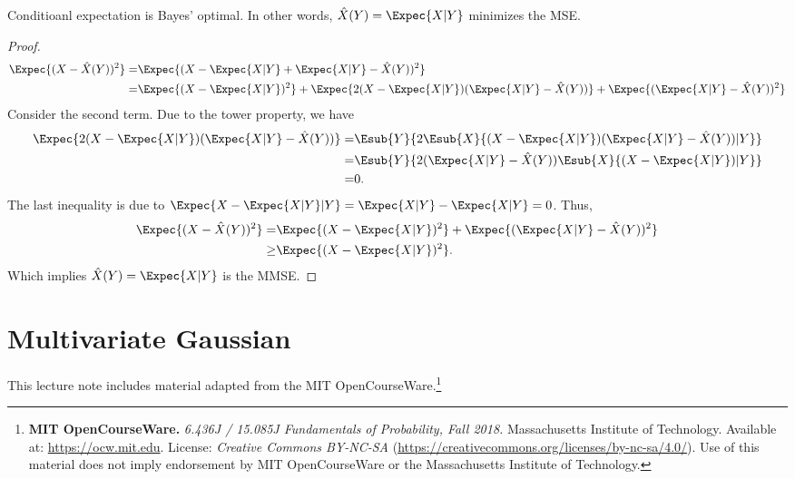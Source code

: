 \documentclass{article}
\begin{document}
\begin{theorem}
    Conditioanl expectation is Bayes' optimal.
    In other words, $\hat{X}(Y) = \Expec{X|Y}$ minimizes the MSE.
\end{theorem}
\begin{proof}
\begin{align}
    \Expec{(X-\hat{X}(Y))^2}=& \Expec{(X-\Expec{X|Y} + \Expec{X|Y} -\hat{X}(Y))^2}\\
    =& \Expec{(X-\Expec{X|Y})^2} + \Expec{2(X-\Expec{X|Y})(\Expec{X|Y}-\hat{X}(Y))}+\Expec{(\Expec{X|Y} -\hat{X}(Y))^2}
\end{align}
Consider the second term.
Due to the tower property, we have
\begin{align}
\Expec{2(X-\Expec{X|Y})(\Expec{X|Y}-\hat{X}(Y))}=& \Esub{Y}{2\Esub{X}{(X-\Expec{X|Y})(\Expec{X|Y}-\hat{X}(Y))|Y}}\\
=& \Esub{Y}{2(\Expec{X|Y}-\hat{X}(Y))\Esub{X}{(X-\Expec{X|Y})|Y}}\\
=& 0.
\end{align}
The last inequality is due to $ \Expec{X - \Expec{X|Y}|Y} = \Expec{X|Y} - \Expec{X|Y}=0$.
Thus,  
\begin{align}
    \Expec{(X-\hat{X}(Y))^2}=& \Expec{(X-\Expec{X|Y})^2} +\Expec{(\Expec{X|Y} -\hat{X}(Y))^2}\\
    \geq& \Expec{(X-\Expec{X|Y})^2}.
\end{align}
Which implies $\hat{X}(Y) = \Expec{X|Y}$ is the MMSE.
\end{proof}






\section{Multivariate Gaussian}
This lecture note includes material adapted from the MIT OpenCourseWare.\footnote{
\textbf{MIT OpenCourseWare.} \emph{6.436J / 15.085J Fundamentals of Probability, Fall 2018.}  
Massachusetts Institute of Technology.  
Available at: \url{https://ocw.mit.edu}.  
License: \textit{Creative Commons BY-NC-SA} (\url{https://creativecommons.org/licenses/by-nc-sa/4.0/}).  
Use of this material does not imply endorsement by MIT OpenCourseWare or the Massachusetts Institute of Technology.
}

\end{document}
